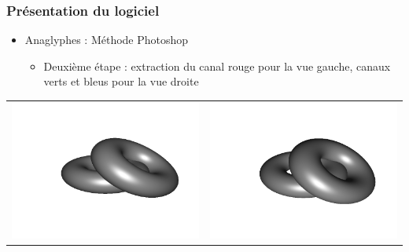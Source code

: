 \documentclass{beamer}
\begin{document}
%
\begin{frame}
\frametitle{Présentation du logiciel}
\begin{itemize}[label=$\bullet$]
\item Anaglyphes : Méthode Photoshop \cite{stereoAnaglyph}
	\begin{itemize}[label=$\circ$]
	\item Deuxième étape : extraction du canal rouge pour la vue gauche, canaux verts et bleus pour la vue droite 
	\end{itemize}
\end{itemize}
\begin{tabular}{l|r}
\includegraphics[scale=0.15]{flip1.png}
&
\includegraphics[scale=0.15]{flip2.png}
\end{tabular}
\end{frame}%
\end{document}

